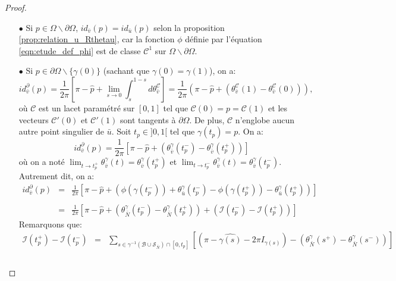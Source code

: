 \begin{proof}
    \begin{itemize}
        \item[$\bullet$] Si $p\in\Omega\backslash\partial\Omega$, $id_{\bar{v}}(p)=id_{\bar{u}}(p)$ selon la proposition \ref{prop:relation_u_Rthetau}, car la fonction $\phi$ définie par l'équation \eqref{eqn:etude_def_phi} est de classe $\mathcal{C}^1$ sur $\Omega\backslash\partial\Omega$.\\
        \item[$\bullet$] Si $p\in\partial\Omega\backslash\{\gamma(0)\}$ (sachant que $\gamma(0)=\gamma(1)$), on a:
        $$
        id^\partial_{\bar{v}}(p)=\frac{1}{2\pi}\left[\pi-\widehat{p}+\displaystyle\lim\limits_{s\rightarrow 0}\int_s^{1-s}d\theta_{\bar{v}}^{\mathcal{C}}\right]=\frac{1}{2\pi}\left(\pi-\widehat{p}+(\theta_{\bar{v}}^{\mathcal{C}}(1)-\theta_{\bar{v}}^{\mathcal{C}}(0))\right),
        $$
        où $\mathcal{C}$ est un lacet paramétré sur $[0, 1]$ tel que $\mathcal{C}(0)=p=\mathcal{C}(1)$ et les vecteurs $\mathcal{C}'(0)$ et $\mathcal{C}'(1)$ sont tangents à $\partial\Omega$. De plus, $\mathcal{C}$ n'englobe aucun autre point singulier de $\bar{u}$. Soit $t_p\in]0, 1[$ tel que $\gamma(t_p)=p$. On a:
        $$
        id^\partial_{\bar{v}}(p)=\frac{1}{2\pi}\left[\pi-\widehat{p}+\left(\theta_{\bar{v}}^\gamma(t_p^-)-\theta_{\bar{v}}^\gamma(t_p^+)\right)\right]
        $$
        où on a noté $\lim_{t\rightarrow t_p^+}\theta^\gamma_{\bar{v}}(t)=\theta^\gamma_{\bar{v}}(t_p^+)$ et $\lim_{t\rightarrow t_p^-}\theta^\gamma_{\bar{v}}(t)=\theta_{\bar{v}}^\gamma(t_p^-)$. Autrement dit, on a:
        $$
        \begin{array}{lcl}
        id^\partial_{\bar{v}}(p)&=&\displaystyle\frac{1}{2\pi}\left[\pi-\widehat{p}+\left(\phi(\gamma(t_p^-))+\theta_{\bar{u}}^\gamma(t_p^-)-\phi(\gamma(t_p^+))-\theta_{\bar{u}}^\gamma(t_p^+)\right)\right]\\\\
        &=&\displaystyle\frac{1}{2\pi}\left[\pi-\widehat{p}+\left(\theta_{\bar{N}}^\gamma(t_p^-)-\theta_{\bar{N}}^\gamma(t_p^+)\right)+\left(\mathcal{I}(t_p^-)-\mathcal{I}(t_p^+)\right)\right]
        \end{array}
        $$
        Remarquons que:
        \begin{eqnarray*}
            \mathcal{I}(t_p^+)-\mathcal{I}(t_p^-)&=&\sum_{s\in\gamma^{-1}(\mathcal{B}\cup\mathcal{S}_{\bar{N}})\cap[0, t_p]}\left[\left(\pi-\widehat{\gamma(s)}-2\pi I_{\gamma(s)}\right)-\left(\theta^{\gamma}_{\bar{N}}(s^+) - \theta^{\gamma}_{\bar{N}}(s^-)\right)\right]\\\\

\end{eqnarray*}
\end{itemize}
\end{proof}
